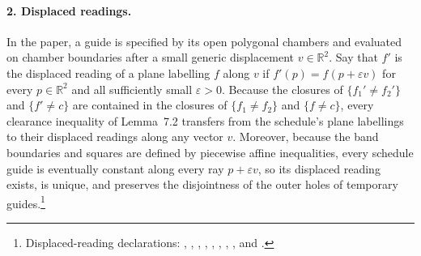 \documentclass{article}
\begin{document}
\paragraph{2. Displaced readings.}
In the paper, a guide is specified by its open polygonal chambers and evaluated
on chamber boundaries after a small generic displacement $v\in\mathbb R^2$. Say
that $f'$ is the displaced reading of a plane labelling $f$ along $v$ if
$f'(p)=f(p+\varepsilon v)$ for every $p\in\mathbb R^2$ and all sufficiently
small $\varepsilon>0$. Because the closures of $\{f_1'\ne f_2'\}$ and
$\{f'\ne c\}$ are contained in the closures of $\{f_1\ne f_2\}$ and $\{f\ne c\}$,
every clearance inequality of Lemma~7.2 transfers from the schedule's plane
labellings to their displaced readings along any vector $v$. Moreover, because
the band boundaries and squares are defined by piecewise affine inequalities,
every schedule guide is eventually constant along every ray $p+\varepsilon v$,
so its displaced reading exists, is unique, and preserves the disjointness of
the outer holes of temporary guides.\footnote{Displaced-reading declarations:
,
,
,
,
,
,
,
, and
.}
\end{document}
